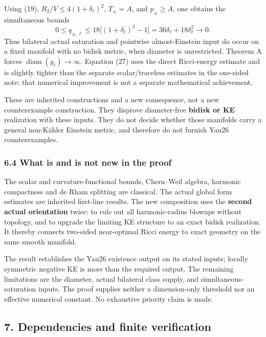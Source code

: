 \documentclass[
  11pt,
]{article}
\begin{document}
Using (19), \(R_2/V\le4(1+\delta_\ell)^2\), \(T_\pm=A\), and
\(p_\pm\ge A\), one obtains the simultaneous bounds \[
 0\le q_{\pm,\ell}
 \le18\bigl[(1+\delta_\ell)^2-1\bigr]
 =36\delta_\ell+18\delta_\ell^2\longrightarrow0.
 \tag{27}
\] Thus bilateral actual saturation and pointwise almost-Einstein input
do occur on a fixed manifold with no bidisk metric, when diameter is
unrestricted. Theorem A forces \(\operatorname{diam}(g_\ell)\to\infty\).
Equation (27) uses the direct Ricci-energy estimate and is slightly
tighter than the separate scalar/traceless estimates in the one-sided
note; that numerical improvement is not a separate mathematical
achievement.

These are inherited constructions and a new consequence, not a new
counterexample construction. They disprove diameter-free \textbf{bidisk
or KE} realization with these inputs. They do not decide whether those
manifolds carry a general non-Kähler Einstein metric, and therefore do
not furnish Yau26 counterexamples.

\hypertarget{what-is-and-is-not-new-in-the-proof}{%
\subsubsection{6.4 What is and is not new in the
proof}\label{what-is-and-is-not-new-in-the-proof}}

The scalar and curvature-functional bounds, Chern--Weil algebra,
harmonic compactness and de Rham splitting are classical. The actual
global form estimates are inherited first-line results. The new
composition uses the \textbf{second actual orientation} twice: to rule
out all harmonic-radius blowups without topology, and to upgrade the
limiting KE structure to an exact bidisk realization. It thereby
connects two-sided near-optimal Ricci energy to exact geometry on the
same smooth manifold.

The result establishes the Yau26 existence output on its stated inputs;
locally symmetric negative KE is more than the required output. The
remaining limitations are the diameter, actual bilateral class supply,
and simultaneous-saturation inputs. The proof supplies neither a
dimension-only threshold nor an effective numerical constant. No
exhaustive priority claim is made.

\hypertarget{dependencies-and-finite-verification}{%
\subsection{7. Dependencies and finite
verification}\label{dependencies-and-finite-verification}}
\end{document}
